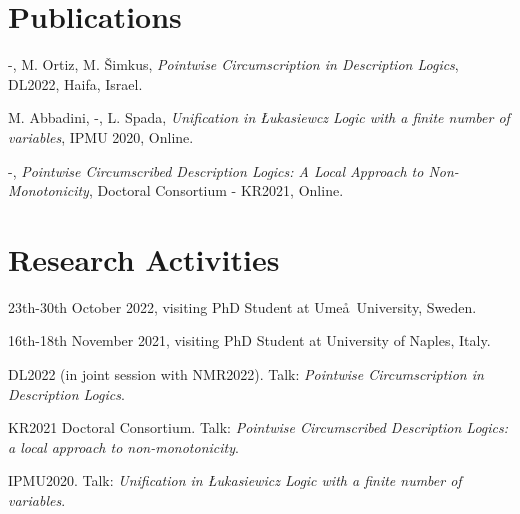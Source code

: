 \documentclass[letterpaper]{deedy-resume} %
\begin{document}
\begin{minipage}[t]{0.33\textwidth} %

\section{}

\end{minipage} %
\hfill
\begin{minipage}[t]{0.66\textwidth} %
\section{Publications} 
\sectionspace
\begin{tightitemize}
\item -, M. Ortiz, M. \v{S}imkus, \emph{Pointwise Circumscription in Description Logics}, DL2022, Haifa, Israel.
\item M. Abbadini, -, L. Spada, \emph{Unification in {\L}ukasiewcz Logic with a finite number of variables}, IPMU 2020, Online.
\end{tightitemize}
\begin{tightitemize}
\item -, \emph{Pointwise Circumscribed Description Logics: A Local Approach to Non-Monotonicity}, Doctoral Consortium - KR2021, Online.
\end{tightitemize}

\sectionspace %




\section{Research Activities} 
\begin{tightitemize}
\item 23th-30th October 2022, visiting PhD Student at Ume\aa\, University, Sweden.
\item 16th-18th November 2021, visiting PhD Student at University of Naples, Italy. 
\end{tightitemize}
\begin{tightitemize}
\item DL2022 (in joint session with NMR2022). Talk: \emph{Pointwise Circumscription in Description Logics}. 
\item KR2021 Doctoral Consortium. Talk: \emph{Pointwise Circumscribed Description Logics: a local approach to non-monotonicity}.
\item IPMU2020. Talk: \emph{Unification in {\L}ukasiewicz Logic with a finite number of variables}.
\end{tightitemize}
%

\end{minipage} %

\end{document}
